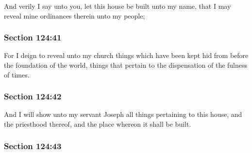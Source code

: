 		And verily I say unto you, let this house be built unto my name, that I may reveal mine ordinances therein unto my people;


	\subsubsection{Section 124:41} %
		\label{DC124-41}

		For I deign to reveal unto my church things which have been kept hid from before the foundation of the world, things that pertain to the dispensation of the fulness of times.


	\subsubsection{Section 124:42} %
		\label{DC124-42}

		And I will show unto my servant Joseph all things pertaining to this house, and the priesthood thereof, and the place whereon it shall be built.


	\subsubsection{Section 124:43} %
		\label{DC124-43}

